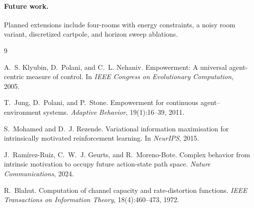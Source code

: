 \documentclass[11pt]{article}
\begin{document}
\paragraph{Future work.}
Planned extensions include four-rooms with energy constraints, a noisy
room variant, discretized cartpole, and horizon sweep ablations.


\begin{thebibliography}{9}

A.~S. Klyubin, D.~Polani, and C.~L. Nehaniv.
\newblock Empowerment: A universal agent-centric measure of control.
\newblock In \emph{IEEE Congress on Evolutionary Computation}, 2005.

T.~Jung, D.~Polani, and P.~Stone.
\newblock Empowerment for continuous agent--environment systems.
\newblock \emph{Adaptive Behavior}, 19(1):16--39, 2011.

S.~Mohamed and D.~J. Rezende.
\newblock Variational information maximisation for intrinsically motivated
  reinforcement learning.
\newblock In \emph{NeurIPS}, 2015.

J.~Ram\'irez-Ruiz, C.~W.~J. Geurts, and R.~Moreno-Bote.
\newblock Complex behavior from intrinsic motivation to occupy future
  action-state path space.
\newblock \emph{Nature Communications}, 2024.

R.~Blahut.
\newblock Computation of channel capacity and rate-distortion functions.
\newblock \emph{IEEE Transactions on Information Theory}, 18(4):460--473, 1972.

\end{thebibliography}
\end{document}
